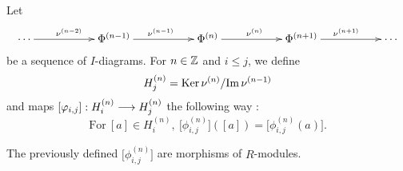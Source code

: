 \documentclass[11pt, a4paper, twoside]{article}
\begin{document}
\begin{defin}
Let 
\begin{displaymath}
    \xymatrix{
        \cdots\ar[rr]^{\nu^{(n-2)}} & &  \Phi^{(n-1)}\ar[rr]^{\nu^{(n-1)}} & &  \Phi^{(n)}\ar[rr]^{\nu^{(n)}} & &  \Phi^{(n+1)}\ar[rr]^{\nu^{(n+1)}} & &\cdots
    }
\end{displaymath}
be a sequence of $I$-diagrams. For $n\in\mathbb{Z}$ and $i\leq j$, we define 
\begin{displaymath}
    H^{(n)}_j=\mathrm{Ker}\thinspace\nu^{(n)}/\mathrm{Im}\thinspace\nu^{(n-1)}
\end{displaymath}
and maps $[\varphi_{i,j}]:H^{(n)}_i\longrightarrow H^{(n)}_j$ the following way :
\begin{displaymath}
    \mathrm{For}\ [a]\in H^{(n)}_i,\ \Big[\phi^{(n)}_{i,j}\Big]([a])=\Big[\phi_{i,j}^{(n)}(a)\Big].
\end{displaymath}
\end{defin}
\begin{prop}
The previously defined $\Big[\phi^{(n)}_{i,j}\Big]$ are morphisms of $R$-modules.
\end{prop}
\end{document}
